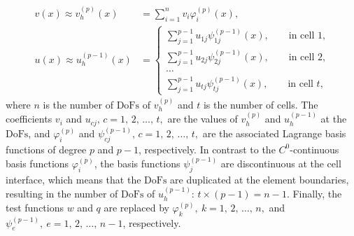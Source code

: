 \documentclass[final,3p]{elsarticle}
\begin{document}
\begin{subequations}
 \begin{align}
 v(x) \approx v _h^{(p)} (x) &= \sum _ {i=1} ^{n} v _{i} \varphi _{i}^{(p)}(x),
 \label{General_MM_var_approx1}
 \\[3ex]
    u(x) \approx u _h^{(p-1)} (x) &=
    \begin{cases}
      \sum\limits _ {j=1} ^{p-1} u _{1j} \psi _{1j} ^{(p-1)}(x), \qquad \text{in cell 1,} \\[3ex]
      \sum\limits _ {j=1} ^{p-1} u _{2j} \psi _{2j} ^{(p-1)}(x), \qquad \text{in cell 2,} \\[2ex]
      \ldots \\[2ex]
      \sum\limits _ {j=1} ^{p-1} u _{tj} \psi _{tj} ^{(p-1)}(x), \qquad \text{in cell }t,
    \end{cases}
    \label{General_MM_var_approx2}
\end{align}	\label{General_MM_var_approx}%
\end{subequations}
where $n$ is the number of $\text{DoFs}$ of $v_h^{(p)}$ and $t$ is the number of cells. The coefficients $v_i$ and $u_{cj}, \, c=1,\,2, \, \ldots, \,t,$ are the values of $v_h^{(p)}$ and $u_h^{(p-1)}$ at the $\text{DoFs}$, and $\varphi _{i}^{(p)}$ and $\psi _{cj} ^{(p-1)}, \, c=1,\,2, \, \ldots, \,t,$ are the associated Lagrange basis functions of degree $p$ and $p-1$, respectively. In contrast to the $C^0$-continuous basis functions $\varphi _{i}^{(p)}$, the basis functions $\psi _{j} ^{(p-1)}$ are discontinuous at the cell interface, which means that the $\text{DoFs}$ are duplicated at the element boundaries, resulting in the number of $\text{DoFs}$ of $u_h^{(p-1)}$: $t \times (p-1)=n-1$. 
Finally, the test functions $w$ and $q$ are replaced by $\varphi _{k}^{(p)} , ~{k} = 1, \,2, \, \ldots , \, n, $ and $ \psi _{e}^{(p-1)} ,~ {e} = 1, \,2, \, \ldots , \, n-1$, respectively.
\end{document}
